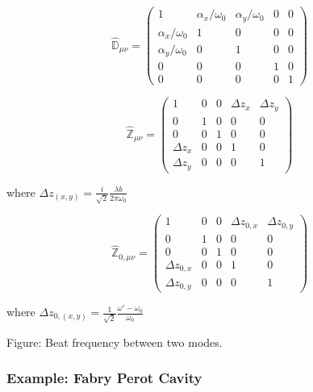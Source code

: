 \documentclass[oneside]{book}
\begin{document}
		\begin{equation} \label{mistrans_matrix}
		\hat{\mathbb{D}}_{\mu \nu} = 
		\begin{pmatrix}
			1					&\alpha_x/\omega_{0}	&\alpha_y/\omega_{0}	& 0 & 0
		\\ \alpha_x/\omega_{0}	&1						&0						& 0 & 0
		\\ \alpha_y/\omega_{0}	&0						&1						& 0	& 0
		\\ 0					&0						&0						& 1	& 0
		\\ 0					&0						&0						& 0 & 1 
		\end{pmatrix}
		\end{equation}
		
		
		\begin{equation} \label{waistloc_matrix}
		\hat{\mathbb{Z}}_{\mu \nu} = 
		\begin{pmatrix}
		1				&0		&0		&\Delta z_x 	&\Delta z_y  
		\\ 0			&1		&0		&0 				&0
		\\ 0			&0		&1		&0 				&0
		\\ \Delta z_x	&0		&0		&1 				&0
		\\ \Delta z_y	&0		&0		&0				&1 
		\end{pmatrix}
		\end{equation}
		
		where $\Delta z_{(x,y)} =  \frac{i}{\sqrt{2}} \frac{\lambda b}{2\pi\omega_{0}} $
		
		
		\begin{equation} \label{waistsize_matrix}
		\hat{\mathbb{Z}}_{0, \mu \nu} = 
		\begin{pmatrix}
		1					&0		&0		&\Delta z_{0,x} 	&\Delta z_{0,y} 
		\\ 0				&1		&0		&0 					&0
		\\ 0				&0		&1		&0 					&0
		\\ \Delta z_{0,x} 	&0		&0		&1 					&0
		\\ \Delta z_{0,y} 	&0		&0		&0					&1 
		\end{pmatrix}
		\end{equation}

		where $\Delta z_{0,(x,y)} =   \frac{1}{\sqrt{2}} \frac{\omega'-\omega_{0}}{\omega_{0}} $

		Figure: Beat frequency between two modes.
		
		
		\subsubsection{Example: Fabry Perot Cavity}
		
\end{document}
